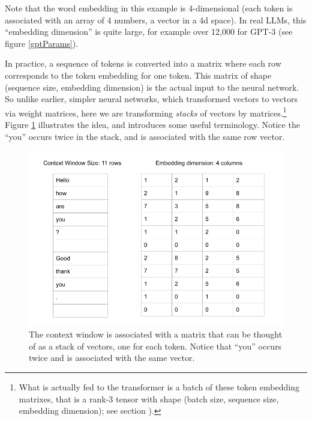 Note that the word embedding in this example is 4-dimensional (each token is associated with an array of 4 numbers, a vector in a 4d space). In real LLMs, this ``embedding dimension'' is quite large, for example over 12,000 for GPT-3 (see figure \ref{gptParams}). 

In practice, a sequence of tokens is converted into a matrix where each row corresponds to the token embedding for one token. This matrix of shape (sequence size, embedding dimension) is the actual input to the neural network. So unlike earlier, simpler neural networks, which transformed vectors to vectors via weight matrices, here we are transforming \emph{stacks} of vectors by matrices.\footnote{What is actually fed to the transformer is a batch of these token embedding matrixes, that is a rank-3 tensor with shape (batch size, sequence size, embedding dimension); see section ).}  Figure \ref{nextWordPrediction} illustrates the idea, and introduces some useful terminology. Notice the ``you'' occurs twice in the stack, and is associated with the same row vector.

\begin{figure}[h]
\centering
\includegraphics[scale=.45]{./images/contextWindowAsStack.png}
\caption[Jeff Yoshimi]{The context window is associated with a matrix that can be thought of as a stack of vectors, one for each token. Notice that ``you'' occurs twice and is associated with the same vector.}
\label{nextWordPrediction}
\end{figure}

